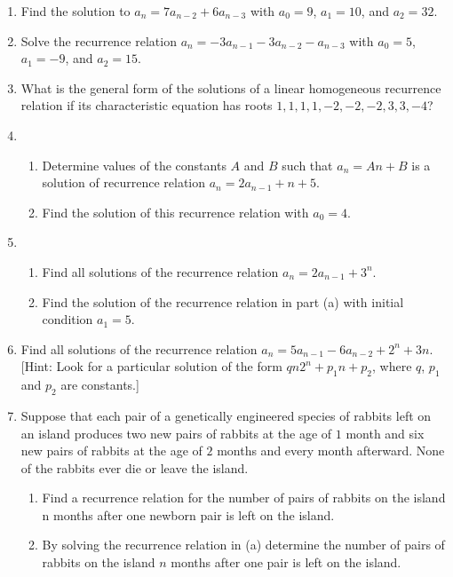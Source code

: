 \documentclass{../../cls/sig-alternate-05-2015}
\begin{document}
\begin{enumerate}
\item
Find the solution to $a_n=7a_{n-2}+6a_{n-3}$ with $a_0=9$, $a_1 = 10$, and $a_2=32$.

\item Solve the recurrence relation $a_n=-3a_{n-1} - 3a_{n-2} - a_{n-3}$ with $a_0 = 5$, $a_1 = -9$, and $a_2 = 15$.

\item What is the general form of the solutions of a linear homogeneous recurrence relation if its characteristic equation
has roots $1, 1, 1, 1, -2, -2, -2, 3, 3, -4$?

\item \begin{enumerate}
	\item Determine values of the constants $A$ and $B$ such
	that $a_n = An + B$ is a solution of recurrence relation $a_n = 2a_{n - 1} + n + 5$.
	\item Find the solution of this recurrence relation with
	$a_0 = 4$.
\end{enumerate}

\item \begin{enumerate}
	\item Find all solutions of the recurrence relation
	$a_n = 2a_{n-1} + 3^n$.
	\item Find the solution of the recurrence relation in part (a)
	with initial condition $a_1 = 5$.
\end{enumerate}

\item Find all solutions of the recurrence relation 
$a_n = 5a_{n-1} - 6a_{n-2} + 2^n + 3n$. 
[Hint: Look for a particular
solution of the form $qn2^n + p_1n + p_2$, where $q$, $p_1$ and
$p_2$ are constants.]

\item Suppose that each pair of a genetically engineered species
of rabbits left on an island produces two new pairs of rabbits at the age of $1$ month and six new pairs of rabbits at
the age of $2$ months and every month afterward. None of
the rabbits ever die or leave the island.
\begin{enumerate}
	\item Find a recurrence relation for the number of pairs of
	rabbits on the island n months after one newborn pair
	is left on the island.
	\item By solving the recurrence relation in (a) determine
	the number of pairs of rabbits on the island $n$ months
	after one pair is left on the island.
\end{enumerate}


\end{enumerate}
\end{document}
